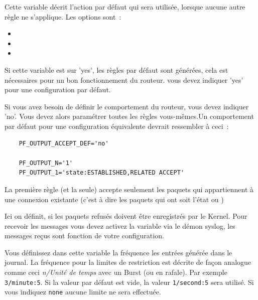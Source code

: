 \begin{description}
Cette variable décrit l'action par défaut qui sera utilisée, lorsque aucune
autre règle ne s'applique. Les options sont~:

\begin{itemize}
\item {}
\item {}
\item {}
\end{itemize}

Si cette variable est sur 'yes', les règles par défaut sont générées, cela est
nécessaires pour un bon fonctionnement du routeur. vous devez indiquer 'yes' pour
une configuration par défaut.

Si vous avez besoin de définir le comportement du routeur, vous devez indiquer
'no'. Vous devez alors paramétrer toutes les règles vous-mêmes.Un comportement
par défaut pour une configuration équivalente devrait ressembler à ceci~:

\begin{example}
{\footnotesize
\begin{verbatim}
    PF_OUTPUT_ACCEPT_DEF='no'

    PF_OUTPUT_N='1'
    PF_OUTPUT_1='state:ESTABLISHED,RELATED ACCEPT'
\end{verbatim}}
\end{example}

La première règle (et la seule) accepte seulement les paquets qui appartiennent
à une connexion existante (c'est à dire les paquets qui ont soit l'état
 ou )

Ici on définit, si les paquets refusés doivent être enregistrés par le Kernel.
Pour recevoir les messages vous devez activez la variable 
via le démon syslog, les messages reçus sont fonction de votre configuration.

Vous définissez dans cette variable la fréquence les entrées générée dans le
journal. La fréquence pour la limites de restriction est décrite de façon
analogue comme ceci \emph{n/Unité de temps} avec un Burst (ou en rafale).
Par exemple \texttt{3/minute:5}. Si la valeur par défaut est vide, la valeur
\texttt{1/second:5} sera utilisé. Si vous indiquez \texttt{none} aucune limite
ne sera effectuée.


\end{description}
